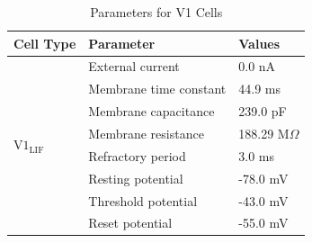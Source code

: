 \documentclass[12pt]{article}
\begin{document}
\begin{table}[H]
  \centering
  \caption{Parameters for V1 Cells}
  \begin{tabular}{lll}
  \toprule
  \textbf{Cell Type} & \textbf{Parameter} & \textbf{Values} \\
  \midrule
  \multirow{8}{*}{$\text{V1}_{\text{LIF}}$} 
      & External current         & 0.0 nA \\
      & Membrane time constant        & 44.9 ms \\
      & Membrane capacitance          & 239.0 pF \\
      & Membrane resistance           & 188.29 M$\Omega$ \\  %
      & Refractory period       & 3.0 ms \\
      & Resting potential          & -78.0 mV \\
      & Threshold potential         & -43.0 mV \\
      & Reset potential      & -55.0 mV \\
  \bottomrule
  \end{tabular}
\end{table}

\end{document}
